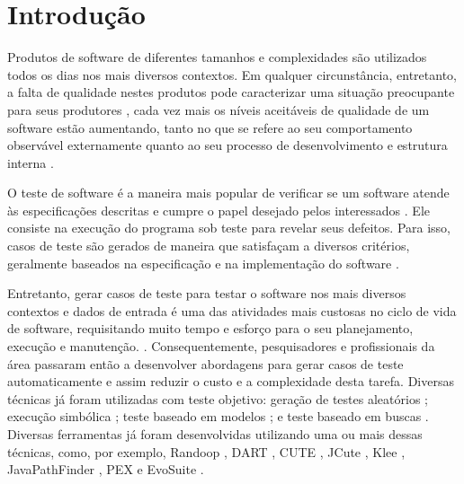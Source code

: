 \documentclass[
	12pt,				%
	oneside,			%
	a4paper,			%
	english,			%
	brazil				%
	]{abntex2ppgsi}
\begin{document}

\tableofcontents*
\cleardoublepage



\textual



% 
%
%
\chapter{Introdução}
\label{chap:introducao}
Produtos de software de diferentes tamanhos e complexidades são utilizados todos os dias nos mais diversos contextos. Em qualquer circunstância, entretanto, a falta de qualidade nestes produtos pode caracterizar uma situação preocupante para seus produtores \cite{hilburn2002software}  \cite{binder1994test}, cada vez mais os níveis aceitáveis de qualidade de um software estão aumentando, tanto no que se refere ao seu comportamento observável externamente quanto ao seu processo de desenvolvimento e estrutura interna \cite{linda2006quality} \cite{bashir2008test} \cite{graham2008foundations}.


O teste de software é a maneira mais popular de verificar se um software atende às especificações descritas e cumpre o papel desejado pelos interessados \cite{sommerville2008engenharia, tahir2014test}. Ele consiste na execução do programa sob teste para revelar seus defeitos. Para isso, casos de teste são gerados de maneira que satisfaçam a diversos critérios, geralmente baseados na especificação e na implementação do software \cite{pezze2008software}. 

Entretanto, gerar casos de teste para testar o software nos mais diversos contextos e dados de entrada é uma das atividades mais custosas no ciclo de vida de software, requisitando muito tempo e esforço para o seu planejamento, execução e manutenção. \cite{tahir2014test}. Consequentemente, pesquisadores e profissionais da área passaram então a desenvolver  abordagens para gerar casos de teste automaticamente e assim reduzir o custo e a complexidade desta tarefa. Diversas técnicas já foram utilizadas com teste objetivo: geração de testes aleatórios \cite{Pacheco2007}; execução simbólica \cite{Cadar2013}; teste baseado em modelos \cite{dick93}; e teste baseado em buscas \cite{McMinn2004, Harman2012}. Diversas ferramentas já foram desenvolvidas utilizando uma ou mais dessas técnicas, como, por exemplo, Randoop \cite{Pacheco2007}, DART \cite{Godefroid2005}, CUTE \cite{Sen2005}, JCute \cite{Sen2006}, Klee \cite{Cadar2008}, JavaPathFinder \cite{Visser2004}, PEX \cite{Tillmann2008} e EvoSuite \cite{Fraser2011}.
\end{document}
